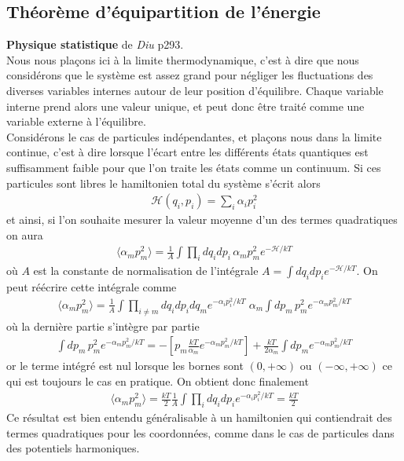 \documentclass[12pt,prb,aps,epsf]{article}
\begin{document}
\subsection{Théorème d'équipartition de l'énergie}
\textbf{Physique statistique} de \textit{Diu} p293.\\

Nous nous plaçons ici à la limite thermodynamique, c'est à dire que nous considérons que le système est assez grand pour négliger les fluctuations des diverses variables internes autour de leur position d'équilibre. Chaque variable interne prend alors une valeur unique, et peut donc être traité comme une variable externe à l'équilibre. \\

Considérons le cas de particules indépendantes, et plaçons nous dans la limite continue, c'est à dire lorsque l'écart entre les différents états quantiques est suffisamment faible pour que l'on traite les états comme un continuum. Si ces particules sont libres le hamiltonien total du système s'écrit alors 
\begin{eqnarray}
\mathcal{H}(q_i,p_i) = \sum_{i}\alpha_i p_i^2
\end{eqnarray}
et ainsi, si l'on souhaite mesurer la valeur moyenne d'un des termes quadratiques on aura 
\begin{eqnarray}
\langle \alpha_m p_m^2 \rangle = \frac{1}{A} \int \prod_{i} dq_i dp_i \,\alpha_m p_m^2 e^{-\mathcal{H}/kT}
\end{eqnarray}
 où $A$ est la constante de normalisation de l'intégrale $A = \int dq_i dp_i e^{-\mathcal{H}/kT}$. On peut réécrire cette intégrale comme 
\begin{eqnarray}
\langle \alpha_m p_m^2 \rangle = \frac{1}{A} \int  \prod_{i\neq m} dq_i dp_i dq_m e^{-\alpha_i p_i^2/kT}
\;\alpha_m\int dp_m \, p_m^2 e^{-\alpha_m p_m^2/kT}
\end{eqnarray}
où la dernière partie s'intègre par partie 
\begin{eqnarray}
\int dp_m \, p_m^2 e^{-\alpha_m p_m^2/kT} = -\left[p_m\frac{kT}{\alpha_m}  e^{-\alpha_m p_m^2/kT}\right] + \frac{kT}{2\alpha_m}\int dp_m e^{-\alpha_m p_m^2/kT}
\end{eqnarray}
or le terme intégré est nul lorsque les bornes sont $(0, +\infty)$ ou $(-\infty, +\infty)$ ce qui est toujours le cas en pratique. On obtient donc finalement 
\begin{eqnarray}
\langle \alpha_m p_m^2 \rangle = \frac{kT}{2} \frac{1}{A}\int \prod_{i} dq_idp_i e^{-\alpha_i p_i^2/kT} = \frac{kT}{2}
\end{eqnarray}
Ce résultat est bien entendu généralisable à un hamiltonien qui contiendrait des termes quadratiques pour les coordonnées, comme dans le cas de particules dans des potentiels harmoniques.
\end{document}
